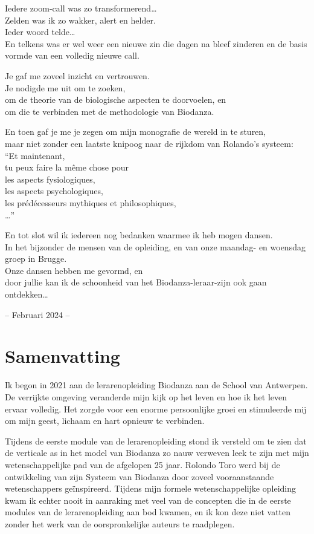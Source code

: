 \documentclass[
  11pt,
]{book}
\begin{document}
Iedere zoom-call was zo transformerend\ldots{}\\
Zelden was ik zo wakker, alert en helder.\\
Ieder woord telde\ldots{}\\
En telkens was er wel weer een nieuwe zin die dagen na bleef zinderen en de basis vormde van een volledig nieuwe call.

Je gaf me zoveel inzicht en vertrouwen.\\
Je nodigde me uit om te zoeken,\\
om de theorie van de biologische aspecten te doorvoelen, en\\
om die te verbinden met de methodologie van Biodanza.

En toen gaf je me je zegen om mijn monografie de wereld in te sturen,\\
maar niet zonder een laatste knipoog naar de rijkdom van Rolando's systeem:\\
``Et maintenant,\\
tu peux faire la même chose pour\\
les aspects fysiologiques,\\
les aspects psychologiques,\\
les prédécesseurs mythiques et philosophiques,\\
\ldots{}''

En tot slot wil ik iedereen nog bedanken waarmee ik heb mogen dansen.\\
In het bijzonder de mensen van de opleiding, en van onze maandag- en woensdag groep in Brugge.\\
Onze dansen hebben me gevormd, en\\
door jullie kan ik de schoonheid van het Biodanza-leraar-zijn ook gaan ontdekken\ldots{}

-- Februari 2024 --

\hypertarget{samenvatting}{%
\chapter*{Samenvatting}\label{samenvatting}}

Ik begon in 2021 aan de lerarenopleiding Biodanza aan de School van Antwerpen. De verrijkte omgeving veranderde mijn kijk op het leven en hoe ik het leven ervaar volledig. Het zorgde voor een enorme persoonlijke groei en stimuleerde mij om mijn geest, lichaam en hart opnieuw te verbinden.

Tijdens de eerste module van de lerarenopleiding stond ik versteld om te zien dat de verticale as in het model van Biodanza zo nauw verweven leek te zijn met mijn wetenschappelijke pad van de afgelopen 25 jaar. Rolondo Toro werd bij de ontwikkeling van zijn Systeem van Biodanza door zoveel vooraanstaande wetenschappers geïnspireerd. Tijdens mijn formele wetenschappelijke opleiding kwam ik echter nooit in aanraking met veel van de concepten die in de eerste modules van de lerarenopleiding aan bod kwamen, en ik kon deze niet vatten zonder het werk van de oorspronkelijke auteurs te raadplegen.
\end{document}
